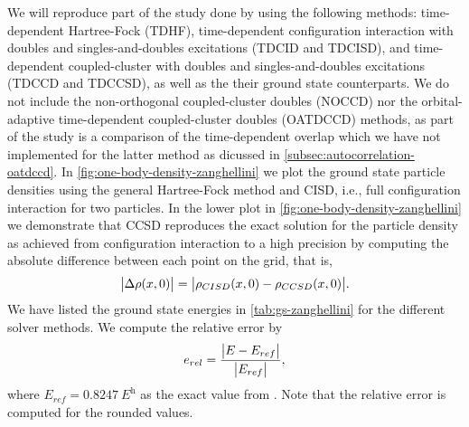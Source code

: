         We will reproduce part of the study done by
        \citeauthor{zanghellini_2004} using the following methods:
        time-dependent Hartree-Fock (TDHF), time-dependent configuration
        interaction with doubles and singles-and-doubles excitations (TDCID and
        TDCISD), and time-dependent coupled-cluster with doubles and
        singles-and-doubles excitations (TDCCD and TDCCSD), as well as the their
        ground state counterparts.
        We do not include the non-orthogonal coupled-cluster doubles (NOCCD) nor
        the orbital-adaptive time-dependent coupled-cluster doubles (OATDCCD)
        methods, as part of the study is a comparison of the time-dependent
        overlap which we have not implemented for the latter method as dicussed
        in \autoref{subsec:autocorrelation-oatdccd}.
        In \autoref{fig:one-body-density-zanghellini} we plot the ground state
        particle densities using the general Hartree-Fock method and CISD, i.e.,
        full configuration interaction for two particles.
        In the lower plot in \autoref{fig:one-body-density-zanghellini} we
        demonstrate that CCSD reproduces the exact solution for the particle
        density as achieved from configuration interaction to a high precision
        by computing the absolute difference between each point on the grid,
        that is,
        \begin{align}
            \abs{\Delta \rho(x, 0)}
            = \abs{\rho_{CISD}(x, 0) - \rho_{CCSD}(x, 0)}.
        \end{align}
        We have listed the ground state energies in \autoref{tab:gs-zanghellini}
        for the different solver methods.
        We compute the relative error by
        \begin{align}
            e_{rel} = \frac{\abs{E - E_{ref}}}{\abs{E_{ref}}},
        \end{align}
        where $E_{ref} = \SI{0.8247}{\hartree}$ as the exact value from
        \citeauthor{zanghellini_2004} \cite{zanghellini_2004}.
        Note that the relative error is computed for the rounded values.

